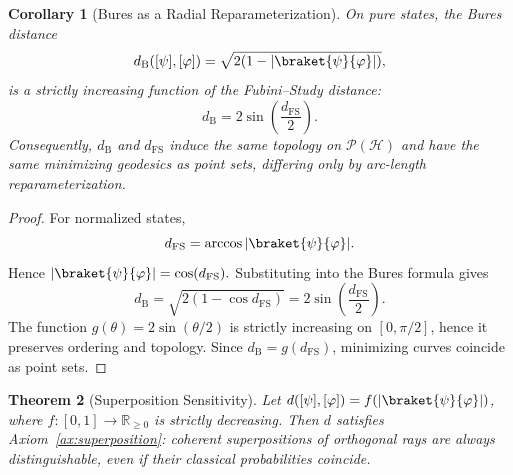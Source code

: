 \documentclass[aps,pra,reprint,nofootinbib,showpacs,superscriptaddress]{revtex4-1}
\newtheorem{theorem}{Theorem}[section]
\newtheorem{corollary}[theorem]{Corollary}
\newcommand{\Hilbert}{\mathcal{H}}
\newcommand{\Proj}{\mathcal{P}}
\begin{document}
\begin{corollary}[Bures as a Radial Reparameterization]
On pure states, the Bures distance
\[
d_{\mathrm{B}}([\psi],[\varphi])
=
\sqrt{2(1-|\braket{\psi}{\varphi}|)},
\]
is a strictly increasing function of the Fubini--Study distance:
\[
d_{\mathrm{B}}
=
2\sin\!\left(\frac{d_{\mathrm{FS}}}{2}\right).
\]
Consequently, $d_{\mathrm{B}}$ and $d_{\mathrm{FS}}$
induce the same topology on $\Proj(\Hilbert)$
and have the same minimizing geodesics as point sets,
differing only by arc-length reparameterization.
\end{corollary}
\begin{proof}
For normalized states,
\[
d_{\mathrm{FS}}
=
\arccos |\braket{\psi}{\varphi}|.
\]
Hence
\(
|\braket{\psi}{\varphi}|
=
\cos(d_{\mathrm{FS}}).
\)
Substituting into the Bures formula gives
\[
d_{\mathrm{B}}
=
\sqrt{2(1-\cos d_{\mathrm{FS}})}
=
2\sin\!\left(\frac{d_{\mathrm{FS}}}{2}\right).
\]
The function $g(\theta)=2\sin(\theta/2)$ is strictly
increasing on $[0,\pi/2]$, hence it preserves ordering
and topology. Since $d_{\mathrm{B}}=g(d_{\mathrm{FS}})$,
minimizing curves coincide as point sets.
\end{proof}




\begin{theorem}[Superposition Sensitivity]
\label{thm:superposition-char}
Let $d([\psi],[\varphi]) = f(|\braket{\psi}{\varphi}|)$, where 
$f:[0,1] \to \mathbb{R}_{\ge 0}$ is strictly decreasing. 
Then $d$ satisfies Axiom~\ref{ax:superposition}: coherent superpositions
of orthogonal rays are always distinguishable, even if their classical probabilities coincide.
\end{theorem}
\end{document}
